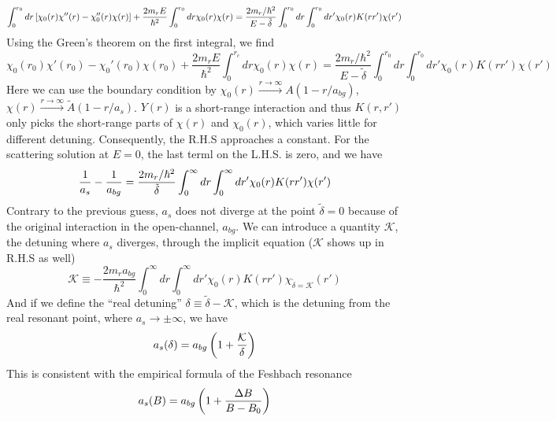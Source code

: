 \begin{equation*}
\int_{0}^{r_{0}}dr\left[\chi_{0}(r)\chi''(r)-\chi_{0}''(r)\chi(r)\right]+\frac{2m_{r}E}{\hbar^{2}}\int_{0}^{r_{0}}dr\chi_{0}(r)\chi(r)
=\frac{2m_{r}/\hbar^{2}}{E-\tilde\delta}\int_{0}^{r_{0}}dr\int_{0}^{r_{0}}dr'\chi_{0}(r)K(rr')\chi(r')
\end{equation*}
Using the Green's theorem on the first integral, we find 
\begin{equation}
\chi_{0}(r_{0})\chi'(r_{0})-\chi_{0}'(r_{0})\chi(r_{0})+\frac{2m_{r}E}{\hbar^{2}}\int_{0}^{r_{c}}dr\chi_{0}(r)\chi(r)
=\frac{2m_{r}/\hbar^{2}}{E-\tilde\delta}\int_{0}^{r_{0}}dr\int_{0}^{r_{0}}dr'\chi_{0}(r)K(rr')\chi(r')
\end{equation}
Here we can use the boundary condition by $\chi_{0}(r)\overset{r\to\infty}\rightarrow{A}(1-r/a_{bg})$, $\chi(r)\overset{r\to\infty}\rightarrow\tilde{A}(1-r/a_{s})$.  $Y(r)$ is a short-range interaction and thus $K(r,r')$ only picks the short-range parts of $\chi(r)$ and $\chi_{0}(r)$, which varies little for different detuning. Consequently,  the R.H.S approaches a constant.  For the scattering solution at  $E=0$, the last terml on the L.H.S. is zero, and we have 
\begin{equation}
\frac{1}{a_{s}}-\frac{1}{a_{bg}}=\frac{2m_{r}/\hbar^{2}}{\tilde\delta}\int_{0}^{\infty}dr\int_{0}^{\infty}dr'\chi_{0}(r)K(rr')\chi(r')
\end{equation}
Contrary to the previous guess, $a_{s}$ does not diverge at the point $\tilde\delta=0$ because of the original interaction in the open-channel, $a_{bg}$.  We can introduce a quantity $\mathcal{K}$, the detuning where $a_{s}$ diverges, through the implicit equation ($\mathcal{K}$ shows up in R.H.S as well)
\begin{equation}\label{eq:intro:kappa}
\mathcal{K}\equiv-\frac{2m_{r}a_{bg}}{\hbar^{2}}\int_{0}^{\infty}{dr}\int_{0}^{\infty}dr'\chi_{0}(r)K(rr')\chi_{\tilde\delta=\mathcal{K}}(r')
\end{equation}
And if we define the ``real detuning'' $\delta\equiv\tilde\delta-\mathcal{K}$, which is the detuning from the real resonant point, where $a_{s}\to\pm\infty$, we have 
\begin{equation}\label{eq:intro:asK}
a_{s}(\delta)=a_{bg}\left(1+\frac{\mathcal{K}}{\delta}\right)
\end{equation}
This is consistent with the empirical formula of the Feshbach resonance
\begin{equation}
a_{s}(B)=a_{bg}\left(1+\frac{\Delta{B}}{B-B_{0}}\right)
\end{equation}
